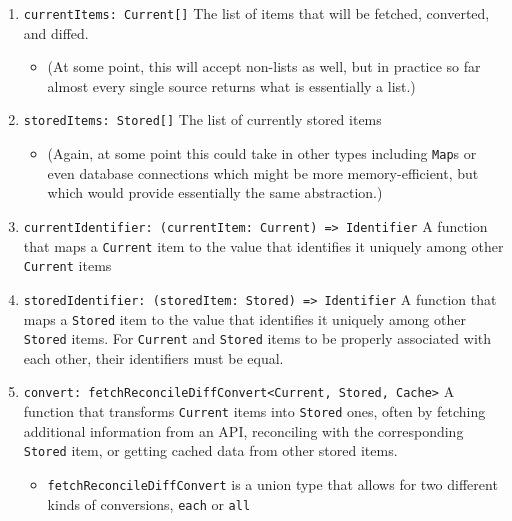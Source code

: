 \documentclass[manuscript,review,anonymous]{acmart}
\begin{document}
\begin{enumerate}
\tightlist
\item
  \texttt{currentItems:\ Current{[}{]}} The list of items that will be
  fetched, converted, and diffed.

  \begin{itemize}
  \tightlist
  \item
    (At some point, this will accept non-lists as well, but in practice
    so far almost every single source returns what is essentially a
    list.)
  \end{itemize}
\item
  \texttt{storedItems:\ Stored{[}{]}} The list of currently stored items

  \begin{itemize}
  \tightlist
  \item
    (Again, at some point this could take in other types including
    \texttt{Map}s or even database connections which might be more
    memory-efficient, but which would provide essentially the same
    abstraction.)
  \end{itemize}
\item
  \texttt{currentIdentifier:\ (currentItem:\ Current)\ =\textgreater{}\ Identifier}
  A function that maps a \texttt{Current} item to the value that
  identifies it uniquely among other \texttt{Current} items
\item
  \texttt{storedIdentifier:\ (storedItem:\ Stored)\ =\textgreater{}\ Identifier}
  A function that maps a \texttt{Stored} item to the value that
  identifies it uniquely among other \texttt{Stored} items. For
  \texttt{Current} and \texttt{Stored} items to be properly associated
  with each other, their identifiers must be equal.
\item
  \texttt{convert:\ fetchReconcileDiffConvert\textless{}Current,\ Stored,\ Cache\textgreater{}}
  A function that transforms \texttt{Current} items into \texttt{Stored}
  ones, often by fetching additional information from an API,
  reconciling with the corresponding \texttt{Stored} item, or getting
  cached data from other stored items.

  \begin{itemize}
  \tightlist
  \item
    \texttt{fetchReconcileDiffConvert} is a union type that allows for
    two different kinds of conversions, \texttt{each} or \texttt{all}


\end{itemize}
\end{enumerate}
\end{document}
